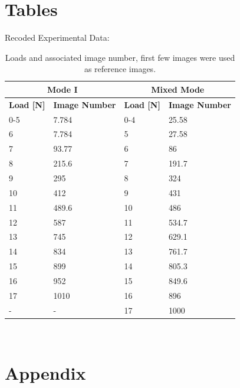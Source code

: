 \documentclass[12pt]{article}
\begin{document}
\section{Tables}
Recoded Experimental Data:
\begin{table}[h]\footnotesize
	\centering
	\begin{tabular}{ |l|l|l|l| }
		\hline
		\multicolumn{2}{|c|}{\textbf{Mode I}}&\multicolumn{2}{|c|}{\textbf{Mixed Mode}}\\ \hline
		\textbf{Load [N]} & \textbf{Image Number}&\textbf{Load [N]} & \textbf{Image Number}\\  \hline
		0-5 & 7.784 & 0-4 & 25.58 \\ \hline
		6& 7.784 & 5 & 27.58 \\ \hline
		7 & 93.77 & 6 & 86 \\ \hline
		8 & 215.6 & 7 &191.7 \\ \hline
		9 & 295 & 8 & 324 \\ \hline
		10 & 412 & 9 & 431 \\ \hline
		11 & 489.6 & 10 & 486 \\ \hline
		12 & 587 & 11 & 534.7 \\ \hline
		13 & 745 & 12 & 629.1 \\ \hline
		14 & 834 & 13 & 761.7 \\ \hline
		15 & 899 & 14 & 805.3 \\ \hline
		16 & 952 & 15 & 849.6 \\ \hline
		17 & 1010 & 16 & 896 \\ \hline
		-	& - & 17 & 1000 \\ \hline
		
		
		
	\end{tabular}
	\caption{Loads and associated image number, first few images were used as reference images.}
	\label{tab:data}
\end{table}
\
\section{Appendix}

%
%

\newpage


\end{document}
